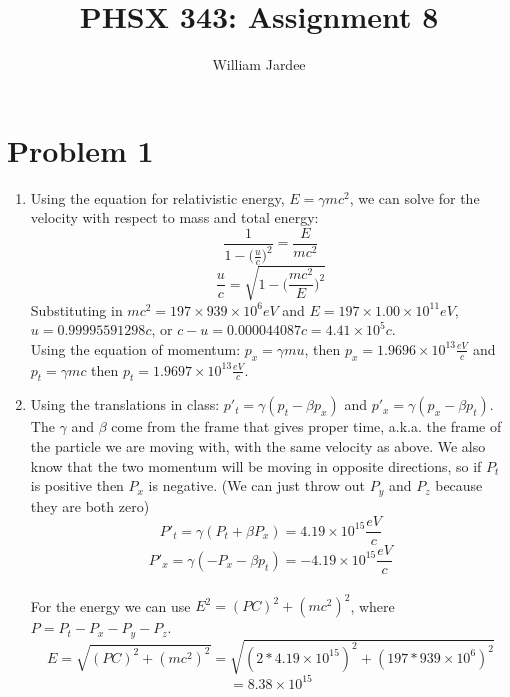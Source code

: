 \documentclass[11pt]{article}
\begin{document}
\date{}

\title{PHSX 343: Assignment 8}

\author{William Jardee}

\maketitle


\section*{Problem 1}
    \begin{enumerate}[label=\alph*)]
        \item 
            Using the equation for relativistic energy, $E = \gamma mc^2$, we can solve for the velocity with respect to mass and total energy:
            \[\frac{1}{1-\Big(\frac{u}{c}\Big)^2} = \frac{E}{mc^2}\]
            \[\frac{u}{c} = \sqrt{1-\Big(\frac{mc^2}{E}\Big)^2}\]
            Substituting in $mc^2 = 197 \times 939\times 10^6eV$ and $E = 197 \times 1.00\times 10^{11}eV$, $u = 0.99995591298c$, or $c-u = 0.000044087c=4.41\times 10^5c$. \\
            Using the equation of momentum: $p_x=\gamma mu$, then $p_x = 1.9696\times 10^{13}\frac{eV}{c}$ and $p_t = \gamma mc$ then $p_t = 1.9697 \times  10^{13} \frac{eV}{c}$.
        \item
            Using the translations in class: $p'_t = \gamma (p_t - \beta p_x)$ and $p'_x = \gamma (p_x - \beta p_t)$. The $\gamma$ and $\beta$ come from the frame that gives proper time, a.k.a. the frame of the particle we are moving with, with the same velocity as above. We also know that the two momentum will be moving in opposite directions, so if $P_t$ is positive then $P_x$ is negative. (We can just throw out $P_y$ and $P_z$ because they are both zero)
            \[P'_t = \gamma (P_t + \beta P_x) = 4.19\times 10^{15} \frac{eV}{c}\]
            \[P'_x = \gamma (-P_x -\beta p_t) = -4.19\times 10^{15} \frac{eV}{c}\]
            \\
            For the energy we can use $E^2 = (PC)^2 + (mc^2)^2$, where $P = P_t - P_x - P_y - P_z$.
            \[E = \sqrt{(PC)^2 + (mc^2)^2}= \sqrt{(2*4.19\times 10^{15})^2+ (197*939\times 10^6)^2}\]
            \[= 8.38\times 10^{15}\]
    
    \end{enumerate}
\end{document}
